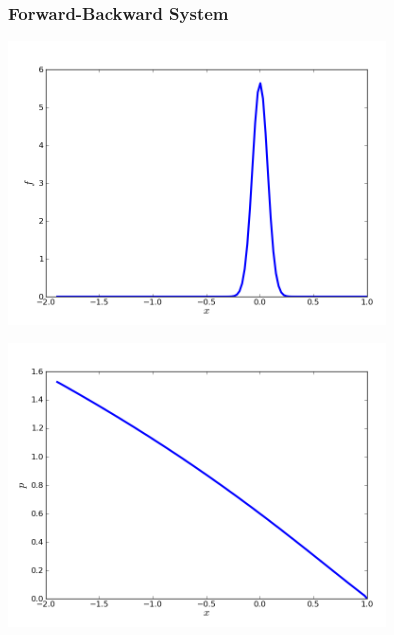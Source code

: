 \documentclass{beamer}
\begin{document}
\begin{frame}
\frametitle{Forward-Backward System}
\begin{minipage}{0.48\linewidth}
\includegraphics[width=0.75\textwidth]{Figs/FP_Adjoint/Stylized__f.png}
\end{minipage}
\vline 
\begin{minipage}{0.48\linewidth}
\begin{flushright}

\includegraphics[width=0.75\textwidth]{Figs/FP_Adjoint/Stylized__p.png}

\end{flushright}
\end{minipage}

\end{frame}
\end{document}

